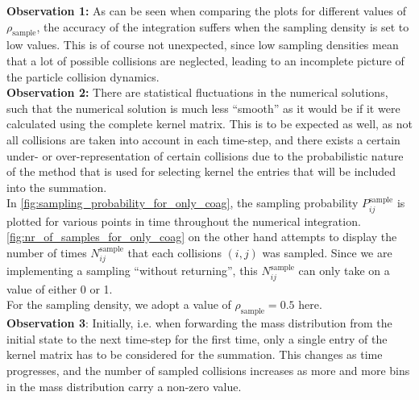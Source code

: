         \textbf{Observation 1:} As can be seen when comparing the plots for different 
        values of $\rho_\text{sample}$, the accuracy of the integration suffers when 
        the sampling density is set to low values. This is of course not unexpected,
        since low sampling densities mean that a lot of possible collisions are neglected,
        leading to an incomplete picture of the particle collision dynamics. \\

        \textbf{Observation 2:} There are statistical fluctuations in the numerical solutions,
        such that the numerical solution is much less ``smooth'' as it would be if it were 
        calculated using the complete kernel matrix.
        This is to be expected as well, as not all collisions are taken into account 
        in each time-step, and there exists a certain under- or over-representation 
        of certain collisions due to the probabilistic nature of the method that is 
        used for selecting kernel the entries that will be included into the summation. \\


        In \cref{fig:sampling_probability_for_only_coag}, the sampling probability 
        $P_{ij}^\text{sample}$ is plotted for various points in time throughout the 
        numerical integration. \cref{fig:nr_of_samples_for_only_coag} on the other 
        hand attempts to display the number of times $N^\text{sample}_{ij}$ that each 
        collisions $(i, j)$ was sampled. Since we are implementing a sampling 
        ``without returning'', this $N^\text{sample}_{ij}$ can only take on a value of 
        either 0 or 1. \\

        For the sampling density, we adopt a value of $\rho_\text{sample} = 0.5$ here. \\

        \textbf{Observation 3}: Initially, i.e. when forwarding the mass distribution from 
        the initial state to the next time-step for the first time, only a single entry of 
        the kernel matrix has to be considered for the summation. This changes as time 
        progresses, and the number of sampled collisions increases as more and more bins 
        in the mass distribution carry a non-zero value. \\

